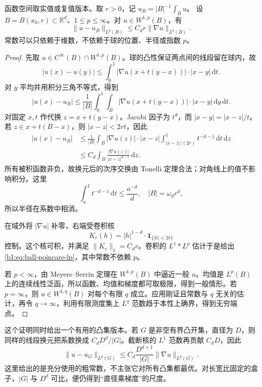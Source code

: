 \begin{theorem}[Poincaré]\label{b1:thm:ball-poincare-lp}
函数空间取实值或复值版本。取 \(r>0\)，记 \(u_B=|B|^{-1}\int_Bu\)。
设 \(B=B(x_0,r)\subset\mathbb R^d\)、\(1\le p\le\infty\)。对 \(u\in W^{1,p}(B)\)，有
\begin{equation}\label{b1:eq:ball-poincare-lp}
 \|u-u_B\|_{L^p(B)}
 \le C_d r\|\nabla u\|_{L^p(B)}.
\end{equation}
常数可以只依赖于维数，不依赖于球的位置、半径或指数 \(p\)。
\end{theorem}
\begin{proof}
先取 \(u\in C^\infty(B)\cap W^{1,p}(B)\)。球的凸性保证两点间的线段留在球内，故
\[
 |u(x)-u(y)|
 \le\int_0^1|\nabla u(x+t(y-x))|\cdot|x-y|\,\mathrm dt.
\]
对 \(y\) 平均并用积分三角不等式，得到
\[
 |u(x)-u_B|
 \le\frac1{|B|}\int_0^1\int_B
   |\nabla u(x+t(y-x))|\cdot|x-y|\,\mathrm dy\,\mathrm dt.
\]
对固定 \(x,t\) 作代换 \(z=x+t(y-x)\)。Jacobi 因子为 \(t^d\)，而 \(|x-y|=|x-z|/t\)。若 \(z\in x+t(B-x)\)，则 \(|x-z|<2rt\)，因此
\[
 \begin{aligned}
 |u(x)-u_B|
 &\le\frac1{|B|}\int_B|\nabla u(z)|\cdot|x-z|
       \int_{|x-z|/(2r)}^1t^{-d-1}\,\mathrm dt\,\mathrm dz\\
 &\le C_d\int_B\frac{|\nabla u(z)|}{|x-z|^{d-1}}\,\mathrm dz.
 \end{aligned}
\]
所有被积函数非负，故换元后的次序交换由 Tonelli 定理合法；对角线上的值不影响积分。这里
\[
 \int_{a}^1t^{-d-1}\,\mathrm dt\le\frac{a^{-d}}d,
 \quad |B|=\omega_dr^d,
\]
所以半径在系数中相消。

在域外将 \(|\nabla u|\) 补零，右端受卷积核
\[
 K_r(h)=|h|^{1-d}\cdot\mathbf1_{\{|h|<2r\}}
\]
控制。这个核可积，并满足 \(\|K_r\|_1=C_dr\)。卷积的 \(L^1*L^p\) 估计于是给出\eqref{b1:eq:ball-poincare-lp}，其中常数不依赖 \(p\)。

若 \(p<\infty\)，由 Meyers--Serrin 定理在 \(W^{1,p}(B)\) 中逼近一般 \(u\)。均值是 \(L^p(B)\) 上的连续线性泛函，所以函数、均值和梯度都可取极限，得到一般情形。若 \(p=\infty\)，则 \(u\in W^{1,q}(B)\) 对每个有限 \(q\) 成立。应用刚证且常数与 \(q\) 无关的估计，再令 \(q\to\infty\)，利用有限测度集上 \(L^q\) 范数趋于本性上确界，得到无穷端点。
\end{proof}

这个证明同时给出一个有用的凸集版本。若 \(G\) 是非空有界凸开集，直径为 \(D\)，则同样的线段换元把系数换成 \(C_dD^d/|G|\)。截断核的 \(L^1\) 范数再贡献 \(C_dD\)，因此
\begin{equation}\label{b1:eq:convex-poincare-shape}
 \|u-u_G\|_{L^p(G)}
 \le C_d\frac{D^{d+1}}{|G|}\|\nabla u\|_{L^p(G)}.
\end{equation}
这里给出的是充分使用的粗常数，不主张它对所有凸集都最优。对长宽比固定的盒子，\(|G|\) 与 \(D^d\) 可比，便仍得到“直径乘梯度”的尺度。

